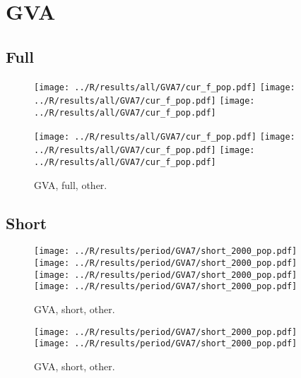 \documentclass[a4paper]{article}
\begin{document}
\newpage
\appendix
\section{GVA}
\subsection{Full}
\label{app:gva.full}

\begin{figure}[!htbp]
\begin{center}
\texttt{[image: ../R/results/all/GVA7/cur\_f\_pop.pdf]}
\texttt{[image: ../R/results/all/GVA7/cur\_f\_pop.pdf]}
\texttt{[image: ../R/results/all/GVA7/cur\_f\_pop.pdf]}
\end{center}
\end{figure}

\begin{figure}[!htbp]
\begin{center}
\texttt{[image: ../R/results/all/GVA7/cur\_f\_pop.pdf]}
\texttt{[image: ../R/results/all/GVA7/cur\_f\_pop.pdf]}
\texttt{[image: ../R/results/all/GVA7/cur\_f\_pop.pdf]}
\caption{GVA, full, other.}
\end{center}
\end{figure}

\newpage
\subsection{Short}
\label{app:gva.cut}

\begin{figure}[!htbp]
\begin{center}
\texttt{[image: ../R/results/period/GVA7/short\_2000\_pop.pdf]}
\texttt{[image: ../R/results/period/GVA7/short\_2000\_pop.pdf]}
\texttt{[image: ../R/results/period/GVA7/short\_2000\_pop.pdf]}
\texttt{[image: ../R/results/period/GVA7/short\_2000\_pop.pdf]}
\caption{GVA, short, other.}
\end{center}
\end{figure}

\begin{figure}[!htbp]
\begin{center}
\texttt{[image: ../R/results/period/GVA7/short\_2000\_pop.pdf]}
\texttt{[image: ../R/results/period/GVA7/short\_2000\_pop.pdf]}
\caption{GVA, short, other.}
\end{center}
\end{figure}
\end{document}
